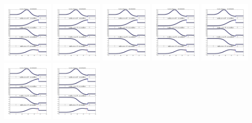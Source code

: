 \documentclass[11pt]{article}
\begin{document}
\vskip 10pt 
\includegraphics[width=0.19\textwidth]{frame0139fig1.png}
\vskip 10pt 
\includegraphics[width=0.19\textwidth]{frame0140fig1.png}
\vskip 10pt 
\includegraphics[width=0.19\textwidth]{frame0141fig1.png}
\vskip 10pt 
\includegraphics[width=0.19\textwidth]{frame0142fig1.png}
\vskip 10pt 
\includegraphics[width=0.19\textwidth]{frame0143fig1.png}
\vskip 10pt 
\includegraphics[width=0.19\textwidth]{frame0144fig1.png}
\vskip 10pt 
\includegraphics[width=0.19\textwidth]{frame0145fig1.png}
\end{document}
